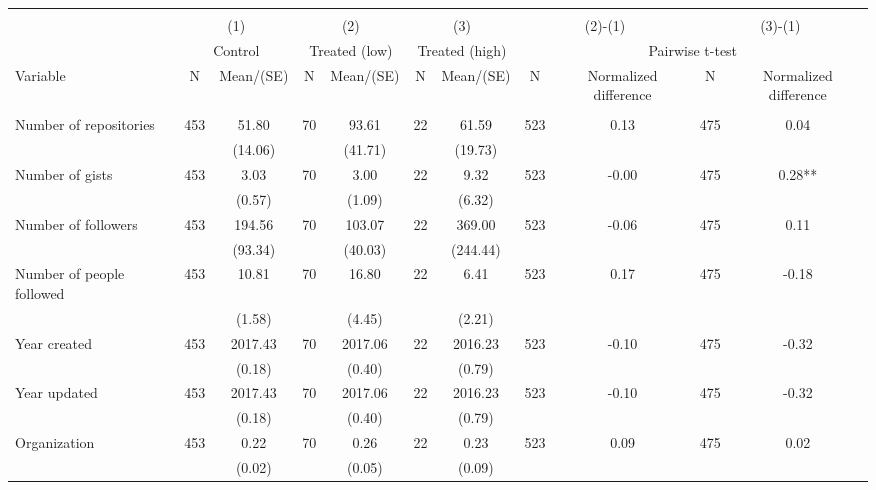 \begin{tabular}{@{\extracolsep{5pt}}lcccccccccc}
\\[-1.8ex]\hline \hline \\[-1.8ex]
 & \multicolumn{2}{c}{(1)}  & \multicolumn{2}{c}{(2)}  & \multicolumn{2}{c}{(3)}  & \multicolumn{2}{c}{(2)-(1)} & \multicolumn{2}{c}{(3)-(1)} \\
 & \multicolumn{2}{c}{Control}  & \multicolumn{2}{c}{Treated (low)}  & \multicolumn{2}{c}{Treated (high)}  & \multicolumn{4}{c}{Pairwise t-test}  \\
Variable & N & Mean/(SE) & N & Mean/(SE) & N & Mean/(SE) & N & Normalized difference & N & Normalized difference \\ \hline \\[-1.8ex] 
Number of repositories   & 453    & 51.80    & 70    & 93.61    & 22    & 61.59    & 523    & 0.13    & 475    & 0.04   \\
 &   & (14.06)  &   & (41.71)  &   & (19.73)  &   &  &   &  \\ [1ex]
Number of gists   & 453    & 3.03    & 70    & 3.00    & 22    & 9.32    & 523    & -0.00    & 475    & 0.28**   \\
 &   & (0.57)  &   & (1.09)  &   & (6.32)  &   &  &   &  \\ [1ex]
Number of followers   & 453    & 194.56    & 70    & 103.07    & 22    & 369.00    & 523    & -0.06    & 475    & 0.11   \\
 &   & (93.34)  &   & (40.03)  &   & (244.44)  &   &  &   &  \\ [1ex]
Number of people followed   & 453    & 10.81    & 70    & 16.80    & 22    & 6.41    & 523    & 0.17    & 475    & -0.18   \\
 &   & (1.58)  &   & (4.45)  &   & (2.21)  &   &  &   &  \\ [1ex]
Year created   & 453    & 2017.43    & 70    & 2017.06    & 22    & 2016.23    & 523    & -0.10    & 475    & -0.32   \\
 &   & (0.18)  &   & (0.40)  &   & (0.79)  &   &  &   &  \\ [1ex]
Year updated   & 453    & 2017.43    & 70    & 2017.06    & 22    & 2016.23    & 523    & -0.10    & 475    & -0.32   \\
 &   & (0.18)  &   & (0.40)  &   & (0.79)  &   &  &   &  \\ [1ex]
Organization   & 453    & 0.22    & 70    & 0.26    & 22    & 0.23    & 523    & 0.09    & 475    & 0.02   \\
 &   & (0.02)  &   & (0.05)  &   & (0.09)  &   &  &   &  \\ [1ex]

\end{tabular}
